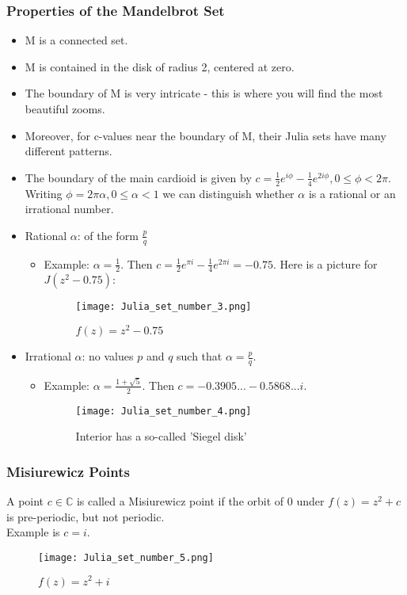 \documentclass{article}
\begin{document}
\subsubsection{Properties of the Mandelbrot Set}
\begin{itemize}
\item M is a connected set.
\item M is contained in the disk of radius 2, centered at zero.
\item The boundary of M is very intricate - this is where you will find the most beautiful zooms.
\item Moreover, for c-values near the boundary of M, their Julia sets have many different patterns.
\item The boundary of the main cardioid is given by $c = \frac{1}{2}e^{i\phi} - \frac{1}{4}e^{2i\phi}, 0 \leq \phi < 2\pi$.\\
Writing $\phi = 2\pi\alpha, 0 \leq \alpha < 1$ we can distinguish whether $\alpha$ is a rational or an irrational number.
\item Rational $\alpha$: of the form $\frac{p}{q}$
\begin{itemize}
\item Example: $\alpha = \frac{1}{2}$. Then $c = \frac{1}{2}e^{\pi i} - \frac{1}{4}e^{2\pi i} = -0.75$. Here is a picture for $J(z^2 - 0.75)$:
\begin{figure}[h]
\centering
\texttt{[image: Julia\_set\_number\_3.png]}
\caption{$f(z) = z^2 - 0.75$}
\end{figure}
\end{itemize}
\item Irrational $\alpha$: no values $p$ and $q$ such that $\alpha = \frac{p}{q}$.
\begin{itemize}
\item Example: $\alpha = \frac{1 + \sqrt{5}}{2}$. Then $c = -0.3905... - 0.5868...i$.
\begin{figure}[h]
\centering
\texttt{[image: Julia\_set\_number\_4.png]}
\caption{Interior has a so-called 'Siegel disk'}
\end{figure}
\end{itemize}
\end{itemize}

\subsubsection{Misiurewicz Points}
A point $c \in \mathbb{C}$ is called a Misiurewicz point if the orbit of 0 under $f(z) = z^2 + c$ is pre-periodic, but not periodic.\\
Example is $c = i$.
\begin{figure}[h]
\centering
\texttt{[image: Julia\_set\_number\_5.png]}
\caption{$f(z) = z^2 + i$}
\end{figure}
\end{document}
